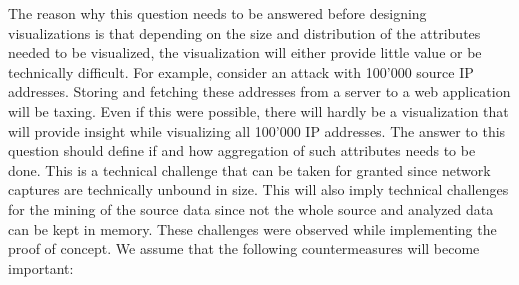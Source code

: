     The reason why this question needs to be answered before designing visualizations is that depending on the size and distribution of the attributes needed to be visualized, the visualization will either provide little value or be technically difficult. For example, consider an attack with 100'000 source IP addresses. Storing and fetching these addresses from a server to a web application will be taxing. Even if this were possible, there will hardly be a visualization that will provide insight while visualizing all 100'000 IP addresses. The answer to this question should define if and how aggregation of such attributes needs to be done.
    This is a technical challenge that can be taken for granted since network captures are technically unbound in size. This will also imply technical challenges for the mining of the source data since not the whole source and analyzed data can be kept in memory.
    These challenges were observed while implementing the proof of concept. We assume that the following countermeasures will become important:
